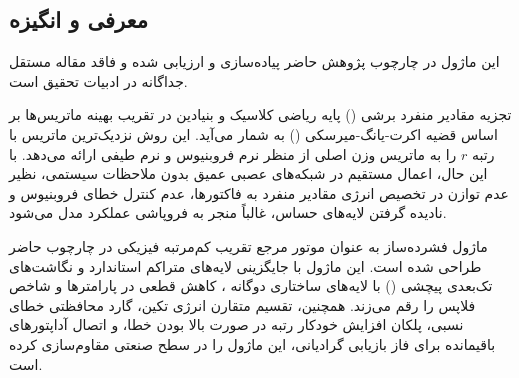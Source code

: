\subsection{معرفی و انگیزه}
این ماژول در چارچوب پژوهش حاضر پیاده‌سازی و ارزیابی شده و فاقد مقاله مستقل جداگانه در ادبیات تحقیق است.

تجزیه مقادیر منفرد برشی () پایه ریاضی کلاسیک و بنیادین در تقریب بهینه ماتریس‌ها بر اساس قضیه اکرت-یانگ-میرسکی () به شمار می‌آید. این روش نزدیک‌ترین ماتریس با رتبه $r$ را به ماتریس وزن اصلی از منظر نرم فروبنیوس و نرم طیفی ارائه می‌دهد. با این حال، اعمال مستقیم  در شبکه‌های عصبی عمیق بدون ملاحظات سیستمی، نظیر عدم توازن در تخصیص انرژی مقادیر منفرد به فاکتورها، عدم کنترل خطای فروبنیوس و نادیده گرفتن لایه‌های حساس، غالباً منجر به فروپاشی عملکرد مدل می‌شود.

ماژول فشرده‌ساز  به عنوان موتور مرجع تقریب کم‌مرتبه فیزیکی در چارچوب حاضر طراحی شده است. این ماژول با جایگزینی لایه‌های متراکم استاندارد و نگاشت‌های تک‌بعدی پیچشی () با لایه‌های ساختاری دوگانه ، کاهش قطعی در پارامترها و شاخص فلاپس را رقم می‌زند. همچنین، تقسیم متقارن انرژی تکین، گارد محافظتی خطای نسبی، پلکان افزایش خودکار رتبه در صورت بالا بودن خطا، و اتصال آداپتورهای باقیمانده  برای فاز بازیابی گرادیانی، این ماژول را در سطح صنعتی مقاوم‌سازی کرده است.
